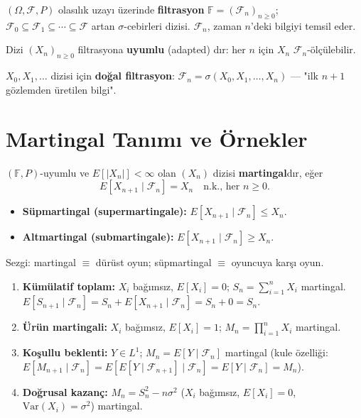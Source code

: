 \begin{tanim}[Filtrasyon]
\label{def:filtrasyon}
$(\Omega,\mathcal{F},P)$ olasılık uzayı üzerinde \textbf{filtrasyon}
$\mathbb{F} = (\mathcal{F}_n)_{n\geq0}$; $\mathcal{F}_0 \subseteq \mathcal{F}_1 \subseteq \cdots \subseteq \mathcal{F}$
artan $\sigma$-cebirleri dizisi. $\mathcal{F}_n$, zaman $n$'deki bilgiyi temsil eder.

Dizi $(X_n)_{n\geq0}$ filtrasyona \textbf{uyumlu} (adapted) dır:
her $n$ için $X_n$ $\mathcal{F}_n$-ölçülebilir.
\end{tanim}

\begin{tanim}
$X_0, X_1, \ldots$ dizisi için \textbf{doğal filtrasyon}:
$\mathcal{F}_n = \sigma(X_0, X_1, \ldots, X_n)$ --- "ilk $n+1$ gözlemden üretilen bilgi".
\end{tanim}

\section{Martingal Tanımı ve Örnekler}
\label{sec:martingal_tanim}

\begin{tanim}[Martingal]
\label{def:martingal}
$(\mathbb{F},P)$-uyumlu ve $E[|X_n|]<\infty$ olan $(X_n)$ dizisi \textbf{martingal}dır, eğer
\[
  E[X_{n+1} \mid \mathcal{F}_n] = X_n \quad \text{n.k., her } n\geq0.
\]
\begin{itemize}
  \item \textbf{Süpmartingal (supermartingale):} $E[X_{n+1}\mid\mathcal{F}_n] \leq X_n$.
  \item \textbf{Altmartingal (submartingale):} $E[X_{n+1}\mid\mathcal{F}_n] \geq X_n$.
\end{itemize}
Sezgi: martingal $\equiv$ dürüst oyun; süpmartingal $\equiv$ oyuncuya karşı oyun.
\end{tanim}

\begin{ornek}
\begin{enumerate}[(1)]
  \item \textbf{Kümülatif toplam:} $X_i$ bağımsız, $E[X_i]=0$; $S_n = \sum_{i=1}^n X_i$ martingal.
        $E[S_{n+1}\mid\mathcal{F}_n] = S_n + E[X_{n+1}\mid\mathcal{F}_n] = S_n + 0 = S_n$.

  \item \textbf{Ürün martingali:} $X_i$ bağımsız, $E[X_i]=1$; $M_n = \prod_{i=1}^n X_i$ martingal.

  \item \textbf{Koşullu beklenti:} $Y \in L^1$; $M_n = E[Y\mid\mathcal{F}_n]$ martingal
        (kule özelliği: $E[M_{n+1}\mid\mathcal{F}_n] = E[E[Y\mid\mathcal{F}_{n+1}]\mid\mathcal{F}_n]
        = E[Y\mid\mathcal{F}_n] = M_n$).

  \item \textbf{Doğrusal kazanç:} $M_n = S_n^2 - n\sigma^2$ ($X_i$ bağımsız, $E[X_i]=0$, $\mathrm{Var}(X_i)=\sigma^2$) martingal.
\end{enumerate}
\end{ornek}

